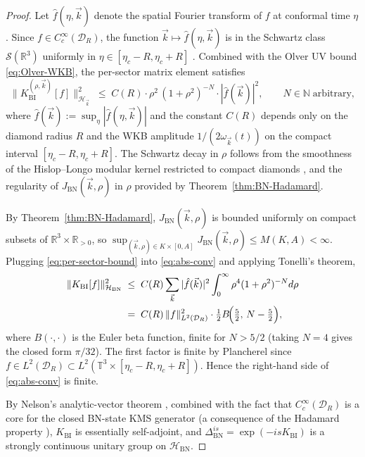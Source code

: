 \documentclass[11pt,a4paper]{article}
\theoremstyle{definition}
\newcommand{\R}{\mathbb{R}}
\newcommand{\N}{\mathbb{N}}
\newcommand{\T}{\mathbb{T}}
\newcommand{\cH}{\mathcal{H}}
\newcommand{\cD}{\mathcal{D}}
\newcommand{\cS}{\mathcal{S}}
\newcommand{\BI}{\mathrm{BI}}
\newcommand{\BN}{\mathrm{BN}}
\begin{document}
\begin{proof}
Let $\hat f(\eta,\vec k)$ denote the spatial Fourier transform of $f$ at
conformal time $\eta$. Since $f\in C_c^\infty(\cD_R)$, the function
$\vec k\mapsto \hat f(\eta,\vec k)$ is in the Schwartz class
$\cS(\R^3)$ uniformly in $\eta\in[\eta_c-R,\eta_c+R]$
\cite[Prop.~7.1]{ReedSimonI}. Combined with the Olver UV bound
\eqref{eq:Olver-WKB}, the per-sector matrix element satisfies
\begin{equation}\label{eq:per-sector-bound}
\big\|K_\BI^{(\rho,\vec k)}[f]\big\|_{\cH_{\vec k}}^2
\;\leq\; C(R)\cdot\rho^2\,(1+\rho^2)^{-N}\cdot|\hat f(\vec k)|^2,
\qquad N\in\N\;\text{arbitrary},
\end{equation}
where $\hat f(\vec k):=\sup_\eta|\hat f(\eta,\vec k)|$ and the constant
$C(R)$ depends only on the diamond radius $R$ and the WKB amplitude
$1/(2\omega_{\vec k}(t))$ on the compact interval $[\eta_c-R,\eta_c+R]$.
The Schwartz decay in $\rho$ follows from the smoothness of the
Hislop--Longo modular kernel restricted to compact diamonds
\cite{HislopLongo82,Frob2023}, and the regularity of $J_\BN(\vec k,\rho)$
in $\rho$ provided by Theorem~\ref{thm:BN-Hadamard}.

By Theorem~\ref{thm:BN-Hadamard}, $J_\BN(\vec k,\rho)$ is bounded uniformly
on compact subsets of $\R^3\times\R_{>0}$, so
$\sup_{(\vec k,\rho)\in K\times[0,A]}J_\BN(\vec k,\rho)\leq M(K,A)<\infty$.
Plugging \eqref{eq:per-sector-bound} into \eqref{eq:abs-conv} and
applying Tonelli's theorem,
\begin{align}
\|K_\BI[f]\|_{\cH_\BN}^2
&\;\leq\; C(R)\sum_{\vec k}|\hat f(\vec k)|^2 \int_0^\infty
\rho^4(1+\rho^2)^{-N}d\rho \notag \\
&\;=\; C(R)\,\|f\|^2_{L^2(\cD_R)}
\cdot \tfrac12 B\!\Big(\tfrac{5}{2},\, N-\tfrac{5}{2}\Big),
\label{eq:final-bound}
\end{align}
where $B(\cdot,\cdot)$ is the Euler beta function, finite for $N>5/2$
(taking $N=4$ gives the closed form $\pi/32$). The first factor is
finite by Plancherel since $f\in L^2(\cD_R)\subset L^2(\T^3\times[\eta_c-R,\eta_c+R])$.
Hence the right-hand side of \eqref{eq:abs-conv} is finite.

By Nelson's analytic-vector theorem \cite[Thm.~X.39]{ReedSimonII},
combined with the fact that $C_c^\infty(\cD_R)$ is a core for
the closed BN-state KMS generator (a consequence of the Hadamard property
\cite{BFV03,SahlmannVerch}), $K_\BI$ is essentially self-adjoint, and
$\Delta_\BN^{is}=\exp(-isK_\BI)$ is a strongly continuous unitary group on
$\cH_\BN$.
\end{proof}
\end{document}

